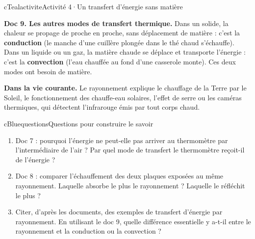 \begin{rub}{cTeal}{activite}{Activité 4\enspace·\enspace Un transfert d’énergie sans matière}
\begin{minipage}[c]{0.5\linewidth}
\centerline{\small{}}
\end{minipage}\par\medskip
\textbf{Doc 9. Les autres modes de transfert thermique.} Dans un solide, la chaleur se propage de proche en proche, sans déplacement de matière : c’est la \textbf{conduction} (le manche d’une cuillère plongée dans le thé chaud s’échauffe). Dans un liquide ou un gaz, la matière chaude se déplace et transporte l’énergie : c’est la \textbf{convection} (l’eau chauffée au fond d’une casserole monte). Ces deux modes ont besoin de matière.\par\medskip
\textbf{Dans la vie courante.} Le rayonnement explique le chauffage de la Terre par le Soleil, le fonctionnement des chauffe-eau solaires, l’effet de serre ou les caméras thermiques, qui détectent l’infrarouge émis par tout corps chaud.
\end{rub}

\begin{rub}{cBlue}{questions}{Questions pour construire le savoir}
\begin{enumerate}
  \item {} Doc 7 : pourquoi l’énergie ne peut-elle pas arriver au thermomètre par l’intermédiaire de l’air ? Par quel mode de transfert le thermomètre reçoit-il de l’énergie ?
  \item {} Doc 8 : comparer l’échauffement des deux plaques exposées au même rayonnement. Laquelle absorbe le plus le rayonnement ? Laquelle le réfléchit le plus ?
  \item {} Citer, d’après les documents, des exemples de transfert d’énergie par rayonnement. En utilisant le doc 9, quelle différence essentielle y a-t-il entre le rayonnement et la conduction ou la convection ?
\end{enumerate}
\end{rub}

